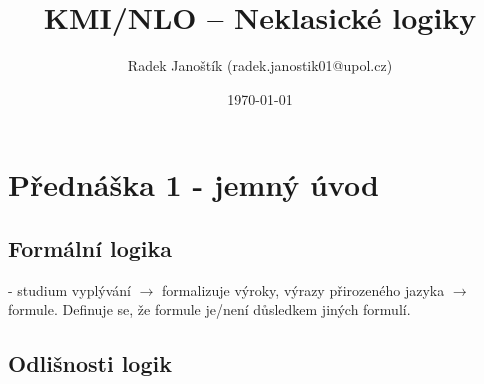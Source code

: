 \documentclass[10pt, a4paper, titlepage]{article}
\title{KMI/NLO  -- Neklasické logiky}
\author{\normalsize{Radek Janoštík (radek.janostik01@upol.cz)}}
\date{\today}
\theoremstyle{note}
\begin{document}
\maketitle
\section{Přednáška 1 - jemný úvod}
\subsection{Formální logika} - studium vyplývání $\rightarrow$ formalizuje výroky, výrazy přirozeného jazyka $\rightarrow$ formule. Definuje se, že formule je/není důsledkem jiných formulí.

\subsection{Odlišnosti logik}
\end{document}
